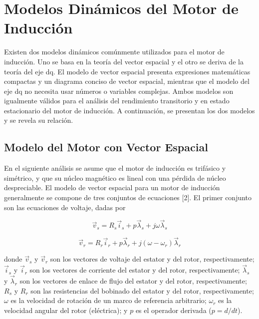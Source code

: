 \documentclass[letterpaper,12pt]{article}
\begin{document}
\section{Modelos Dinámicos del Motor de Inducción}

Existen dos modelos dinámicos comúnmente utilizados para el motor de inducción. Uno se basa en la teoría del vector espacial y el otro se deriva de la teoría del eje dq. El modelo de vector espacial presenta expresiones matemáticas compactas y un diagrama conciso de vector espacial, mientras que el modelo del eje dq no necesita usar números o variables complejas. Ambos modelos son igualmente válidos para el análisis del rendimiento transitorio y en estado estacionario del motor de inducción. A continuación, se presentan los dos modelos y se revela su relación.

\clearpage
\subsection{Modelo del Motor con Vector Espacial}

En el siguiente análisis se asume que el motor de inducción es trifásico y simétrico, y que su núcleo magnético es lineal con una pérdida de núcleo despreciable. El modelo de vector espacial para un motor de inducción generalmente se compone de tres conjuntos de ecuaciones [2]. El primer conjunto son las ecuaciones de voltaje, dadas por

\begin{equation}
\vec{v}_s = R_s \vec{i}_s + p \vec{\lambda}_s + j\omega \vec{\lambda}_s \tag{14.3-1}
\end{equation}

\begin{equation}
\vec{v}_r = R_r \vec{i}_r + p \vec{\lambda}_r + j(\omega - \omega_r)\vec{\lambda}_r \tag{14.3-1}
\end{equation}

donde $\vec{v}_s$ y $\vec{v}_r$ son los vectores de voltaje del estator y del rotor, respectivamente; $\vec{i}_s$ y $\vec{i}_r$ son los vectores de corriente del estator y del rotor, respectivamente; $\vec{\lambda}_s$ y $\vec{\lambda}_r$ son los vectores de enlace de flujo del estator y del rotor, respectivamente; $R_s$ y $R_r$ son las resistencias del bobinado del estator y del rotor, respectivamente; $\omega$ es la velocidad de rotación de un marco de referencia arbitrario; $\omega_r$ es la velocidad angular del rotor (eléctrica); y $p$ es el operador derivada ($p = d/dt$).
\end{document}

